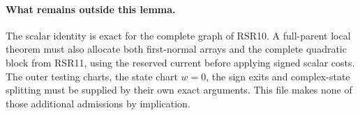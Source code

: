 \paragraph{What remains outside this lemma.}
The scalar identity is exact for the complete graph of RSR10. A
full-parent local theorem must also allocate both first-normal arrays
and the complete quadratic block from RSR11, using the reserved
current before applying signed scalar costs. The outer testing charts,
the state chart $w=0$, the sign exits and complex-state splitting must
be supplied by their own exact arguments. This file makes none of
those additional admissions by implication.
